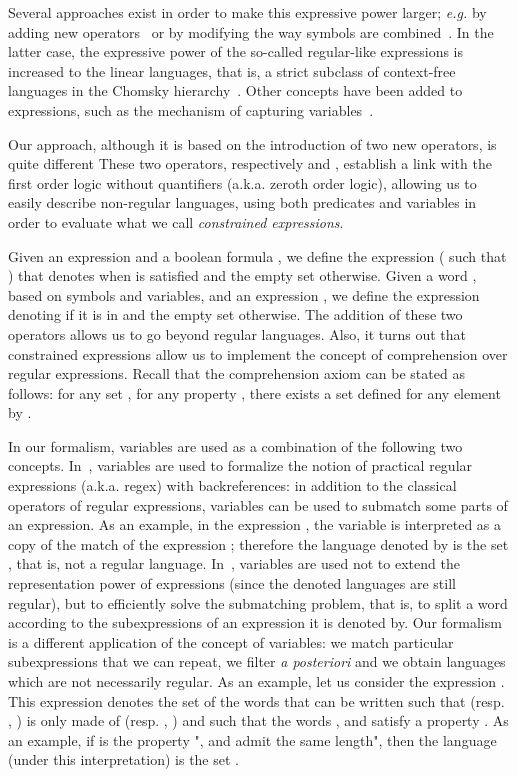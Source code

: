 \documentclass[a4paper]{llncs}
\begin{document}
  Several approaches exist in order to make this expressive power larger; \emph{e.g.} by adding new operators~\cite{CDJM13} or by modifying the way symbols are combined~\cite{Brz68,Semp00}. In the latter case, the expressive power of the so-called regular-like expressions is increased to the linear languages, that is, a strict subclass of context-free languages in the Chomsky hierarchy~\cite{Cho56}.
  Other concepts have been added to expressions, such as the mechanism of capturing variables~\cite{CSY03,SL12}.
  
Our approach, although it is based on the introduction of two new operators, is quite different
These two operators, respectively  and , establish a link with the first order logic without quantifiers (a.k.a. zeroth order logic), allowing us to easily describe non-regular languages, using both predicates and variables in order to evaluate  what we call \emph{constrained expressions}.

Given an expression  and a boolean formula , we define the expression  ( such that ) that denotes  when  is satisfied and the empty set otherwise. Given a word , based on symbols and variables, and an expression , we define the expression  denoting  if it is in  and the empty set otherwise. The addition of these two operators allows us to go beyond regular languages.
Also, it turns out that constrained expressions allow us to implement  the concept of comprehension over regular expressions. Recall that the comprehension axiom can be stated as follows: for any set , for any property , there exists a set  defined for any element  by   .  

    
  In our formalism, variables are used as a combination of the following two concepts.
  In~\cite{CSY03}, variables are used to formalize the notion of practical regular expressions (a.k.a. regex) with backreferences: in addition to the classical operators of regular expressions, variables can be used to submatch some parts of an expression. As an example, in the expression , the variable  is interpreted as a copy of the match of the expression ; therefore the language denoted by  is the set , that is, not a regular language.
  In~\cite{SL12}, variables are used not to extend the representation power of expressions (since the denoted languages are still regular), but to efficiently solve the submatching problem, that is, to split a word according to the subexpressions of an expression it is denoted by.
  Our formalism is a different application of the concept of variables: we match particular subexpressions that we can repeat, we filter \emph{a posteriori} and we obtain languages which are not necessarily regular. As an example, let us consider the expression . This expression denotes the set of the words that can be written  such that  (resp. , ) is only made of  (resp. , ) and such that the words ,  and  satisfy a property . As an example, if  is the property ",  and  admit the same length", then the language (under this interpretation) is the set .
\end{document}
